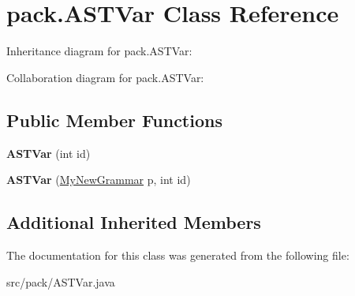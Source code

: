 \hypertarget{classpack_1_1_a_s_t_var}{}\section{pack.\+A\+S\+T\+Var Class Reference}
\label{classpack_1_1_a_s_t_var}


Inheritance diagram for pack.\+A\+S\+T\+Var\+:


Collaboration diagram for pack.\+A\+S\+T\+Var\+:
\subsection*{Public Member Functions}
\begin{DoxyCompactItemize}
\item 
{\bfseries A\+S\+T\+Var} (int id)\hypertarget{classpack_1_1_a_s_t_var_a2037dd2dacbeb710a41e66f2612d6bb0}{}\label{classpack_1_1_a_s_t_var_a2037dd2dacbeb710a41e66f2612d6bb0}

\item 
{\bfseries A\+S\+T\+Var} (\hyperlink{classpack_1_1_my_new_grammar}{My\+New\+Grammar} p, int id)\hypertarget{classpack_1_1_a_s_t_var_ae2d29691a9d336fbd350fee8d1093c33}{}\label{classpack_1_1_a_s_t_var_ae2d29691a9d336fbd350fee8d1093c33}

\end{DoxyCompactItemize}
\subsection*{Additional Inherited Members}


The documentation for this class was generated from the following file\+:\begin{DoxyCompactItemize}
\item 
src/pack/A\+S\+T\+Var.\+java\end{DoxyCompactItemize}
